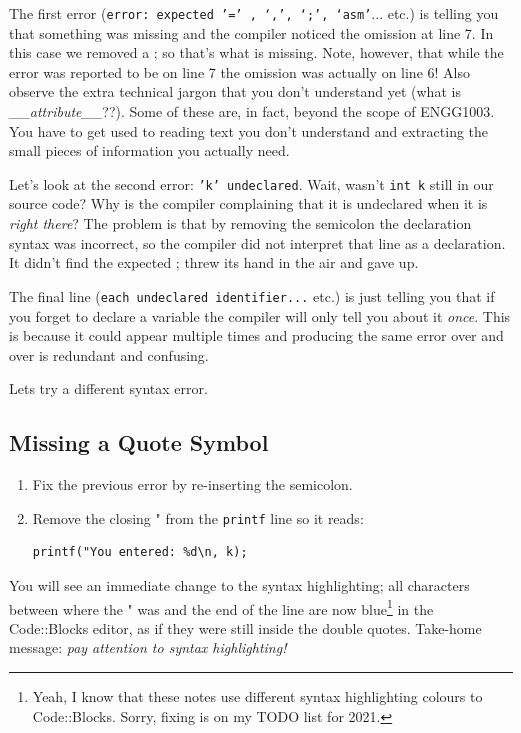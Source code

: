 \documentclass{lab}
\begin{document}
The first error (\texttt{error: expected '=' , ‘,’, ‘;’, ‘asm'}... etc.) is telling you that something was missing and the compiler noticed the omission at line 7. In this case we removed a ; so that's what is missing. Note, however, that while the error was reported to be on line 7 the omission was actually on line 6! Also observe the extra technical jargon that you don't understand yet (what is \textit{\_\_attribute\_\_}??). Some of these are, in fact, beyond the scope of ENGG1003. You have to get used to reading text you don't understand and extracting the small pieces of information you actually need.

Let's look at the second error: \texttt{'k' undeclared}. Wait, wasn't \texttt{int k} still in our source code? Why is the compiler complaining that it is undeclared when it is \textit{right there}? The problem is that by removing the semicolon the declaration syntax was incorrect, so the compiler did not interpret that line as a declaration. It didn't find the expected ; threw its hand in the air and gave up.

The final line (\texttt{each undeclared identifier...} etc.) is just telling you that if you forget to declare a variable the compiler will only tell you about it \textit{once}. This is because it could appear multiple times and producing the same error over and over is redundant and confusing.

Lets try a different syntax error.

\subsection{Missing a Quote Symbol}

\begin{task}{}{}
\begin{enumerate}
\item Fix the previous error by re-inserting the semicolon.
\item Remove the closing " from the \texttt{printf} line so it reads:
\begin{lstlisting}[style=CStyle]
printf("You entered: %d\n, k);
\end{lstlisting}
\end{enumerate}
\end{task}

You will see an immediate change to the syntax highlighting; all characters between where the " was and the end of the line are now blue\footnote{Yeah, I know that these notes use different syntax highlighting colours to Code::Blocks. Sorry, fixing is on my TODO list for 2021.} in the Code::Blocks editor, as if they were still inside the double quotes. Take-home message: \textit{pay attention to syntax highlighting!}
\end{document}

